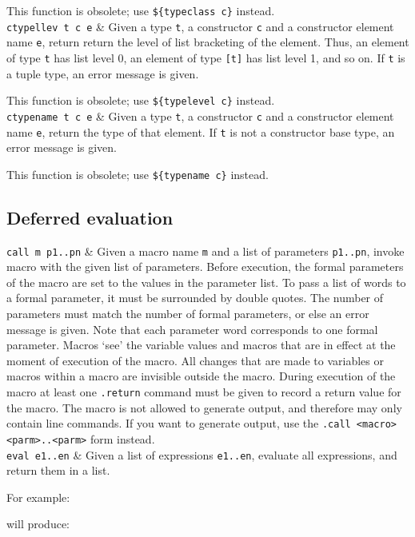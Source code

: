 \begin{desctab}
This function is obsolete; use \verb'${typeclass c}' instead.
\\
\texttt{ctypellev t c e}
&
Given a type \texttt{t}, a constructor \texttt{c} and a constructor element name
\texttt{e}, return return the level of list bracketing of the element. Thus,
an element of type \verb't' has list level 0, an element of type
\verb'[t]' has list level 1, and so on.  If \texttt{t} is a tuple type,
an error message is given.

This function is obsolete; use \verb'${typelevel c}' instead.
\\
\texttt{ctypename t c e}
&
Given a type \texttt{t},
a constructor \texttt{c}
and a constructor element name \texttt{e},
return the type of that element.
If \texttt{t} is not a constructor base type, an error message is given.

This function is obsolete; use \verb'${typename c}' instead.
\\
\end{desctab}
\subsection{Deferred evaluation}
\begin{desctab}
\texttt{call m p1..pn}
&
Given a macro name \verb+m+ and a list of parameters \verb+p1..pn+,
invoke macro with the given list of parameters.
Before execution,
the formal parameters of the macro are set to the values in the parameter list.
To pass a list of words to a formal parameter,
it must be surrounded by double quotes.
The number of parameters must match the number of formal parameters,
or else an error message is given.
Note that each parameter word corresponds to one formal parameter.
Macros `see' the variable values and macros that are in effect at the moment
of execution of the macro.
All changes that are made to variables or macros within a macro
are invisible outside the macro.
During execution of the macro at least one \verb+.return+ command must be
given to record a return value for the macro.
The macro is not allowed to generate output, and therefore may only contain
line commands.
If you want to generate output, 
use the \verb+.call <macro> <parm>..<parm>+ form instead.
\\
\texttt{eval e1..en}
&
Given a list of expressions \verb+e1..en+, evaluate all expressions,
and return them in a list.
\\
\end{desctab}
For example:
\begin{showfile}

\end{showfile}
will produce:
\begin{showfile}

\end{showfile}


